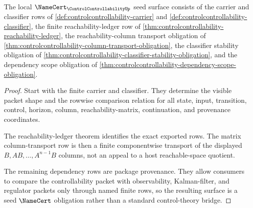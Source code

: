 \begin{theorem}
\label{thm:controlcontrollability-namecert-obligation-surface}
The local $\NameCert_{\ControlControllabilityUp}$ seed surface consists of the carrier and classifier rows of \autoref{def:controlcontrollability-carrier} and \autoref{def:controlcontrollability-classifier}, the finite reachability-ledger row of \autoref{thm:controlcontrollability-reachability-ledger}, the reachability-column transport obligation of \autoref{thm:controlcontrollability-column-transport-obligation}, the classifier stability obligation of \autoref{thm:controlcontrollability-classifier-stability-obligation}, and the dependency scope obligation of \autoref{thm:controlcontrollability-dependency-scope-obligation}.
\end{theorem}
\begin{proof}
Start with the finite carrier and classifier. They determine the visible packet shape and the rowwise comparison relation for all state, input, transition, control, horizon, column, reachability-matrix, continuation, and provenance coordinates.

The reachability-ledger theorem identifies the exact exported rows. The matrix column-transport row is then a finite componentwise transport of the displayed $B,AB,\ldots,A^{n-1}B$ columns, not an appeal to a host reachable-space quotient.

The remaining dependency rows are package provenance. They allow consumers to compare the controllability packet with observability, Kalman-filter, and regulator packets only through named finite rows, so the resulting surface is a seed $\NameCert$ obligation rather than a standard control-theory bridge.
\end{proof}

